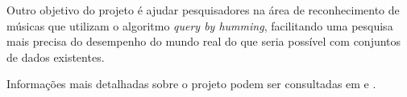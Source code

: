 Outro objetivo do projeto é ajudar pesquisadores na área de reconhecimento de músicas que utilizam o algoritmo \textit{query by humming}, facilitando uma pesquisa mais precisa do desempenho do mundo real do que seria possível com conjuntos de dados existentes.

Informações mais detalhadas sobre o projeto podem ser consultadas em \cite{pardo2010, pardo2012} e \cite{huq2010}.


